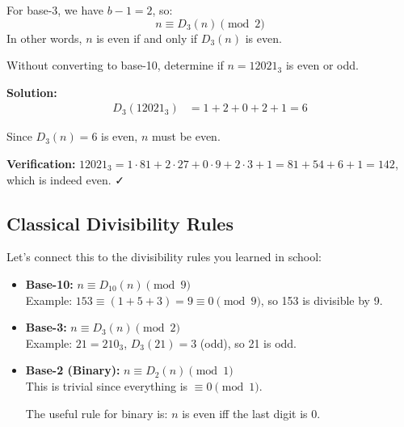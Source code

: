 \begin{theorem}
\label{thm:parity-rule}
\label{cor:base3-parity}
For base-3, we have $b-1 = 2$, so:
\begin{equation}
n \equiv D_3(n) \pmod{2}
\end{equation}
In other words, $n$ is even if and only if $D_3(n)$ is even.
\end{theorem}

\begin{example}
Without converting to base-10, determine if $n = 12021_3$ is even or odd.

\textbf{Solution:}
\begin{align}
D_3(12021_3) &= 1 + 2 + 0 + 2 + 1 = 6
\end{align}

Since $D_3(n) = 6$ is even, $n$ must be even.

\textbf{Verification:} $12021_3 = 1 \cdot 81 + 2 \cdot 27 + 0 \cdot 9 + 2 \cdot 3 + 1 = 81 + 54 + 6 + 1 = 142$, which is indeed even. ✓
\end{example}

\subsection{Classical Divisibility Rules}
\label{subsec:classical-rules}

Let's connect this to the divisibility rules you learned in school:

\begin{keyidea}
\begin{itemize}
\item \textbf{Base-10:} $n \equiv D_{10}(n) \pmod{9}$ \\
Example: $153 \equiv (1+5+3) = 9 \equiv 0 \pmod{9}$, so 153 is divisible by 9.

\item \textbf{Base-3:} $n \equiv D_3(n) \pmod{2}$ \\
Example: $21 = 210_3$, $D_3(21) = 3$ (odd), so 21 is odd.

\item \textbf{Base-2 (Binary):} $n \equiv D_2(n) \pmod{1}$\\
This is trivial since everything is $\equiv 0 \pmod{1}$.

The useful rule for binary is: $n$ is even iff the last digit is 0.
\end{itemize}
\end{keyidea}

